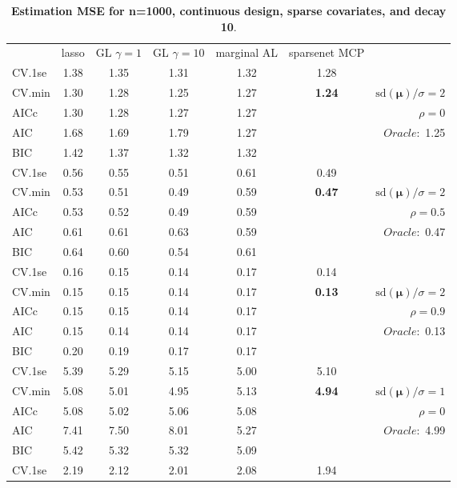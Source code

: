 \clearpage
\begin{table}\vspace{-.5cm}
\caption[l]{ { \bf Estimation MSE for n=1000, continuous design, 
sparse covariates, and  decay  10}.}
\vspace{-.5cm}
\footnotesize{}
\begin{center}
\begin{tabular}{l*{5}{c}|r}
& lasso & GL $\gamma=1$ & GL $\gamma=10$ & marginal AL & sparsenet MCP  & \\
 \cline{1-7}
CV.1se & 1.38 & 1.35 & 1.31 & 1.32 & 1.28 & \\
CV.min & 1.30 & 1.28 & 1.25 & 1.27 & {\bf 1.24} &  $\mathrm{sd}(\mathbf{\mu})/\sigma=2$ \\
AICc & 1.30 & 1.28 & 1.27 & 1.27 & & $\rho=0$ \\
AIC & 1.68 & 1.69 & 1.79 & 1.27 & &  \multirow{2}{*}{$Oracle: $ 1.25} \\
BIC & 1.42 & 1.37 & 1.32 & 1.32 & &  \\
 \hline 
CV.1se & 0.56 & 0.55 & 0.51 & 0.61 & 0.49 & \\
CV.min & 0.53 & 0.51 & 0.49 & 0.59 & {\bf 0.47} &  $\mathrm{sd}(\mathbf{\mu})/\sigma=2$ \\
AICc & 0.53 & 0.52 & 0.49 & 0.59 & & $\rho=0.5$ \\
AIC & 0.61 & 0.61 & 0.63 & 0.59 & &  \multirow{2}{*}{$Oracle: $ 0.47} \\
BIC & 0.64 & 0.60 & 0.54 & 0.61 & &  \\
 \hline 
CV.1se & 0.16 & 0.15 & 0.14 & 0.17 & 0.14 & \\
CV.min & 0.15 & 0.15 & 0.14 & 0.17 & {\bf 0.13} &  $\mathrm{sd}(\mathbf{\mu})/\sigma=2$ \\
AICc & 0.15 & 0.15 & 0.14 & 0.17 & & $\rho=0.9$ \\
AIC & 0.15 & 0.14 & 0.14 & 0.17 & &  \multirow{2}{*}{$Oracle: $ 0.13} \\
BIC & 0.20 & 0.19 & 0.17 & 0.17 & &  \\
 \hline 
CV.1se & 5.39 & 5.29 & 5.15 & 5.00 & 5.10 & \\
CV.min & 5.08 & 5.01 & 4.95 & 5.13 & {\bf 4.94} &  $\mathrm{sd}(\mathbf{\mu})/\sigma=1$ \\
AICc & 5.08 & 5.02 & 5.06 & 5.08 & & $\rho=0$ \\
AIC & 7.41 & 7.50 & 8.01 & 5.27 & &  \multirow{2}{*}{$Oracle: $ 4.99} \\
BIC & 5.42 & 5.32 & 5.32 & 5.09 & &  \\
 \hline 
CV.1se & 2.19 & 2.12 & 2.01 & 2.08 & 1.94 & \\

\end{tabular}
\end{center}
\end{table}
